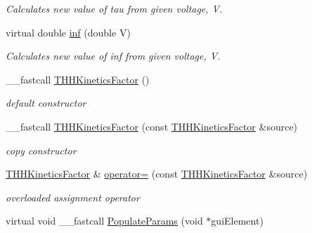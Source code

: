 \begin{DoxyCompactItemize}
\begin{DoxyCompactList}\small\item\em Calculates new value of tau from given voltage, V. \end{DoxyCompactList}\item 
\hypertarget{class_t_h_h_kinetics_factor_a21c8dff53e3fd122ac0a59bcc97e4b61}{virtual double \hyperlink{class_t_h_h_kinetics_factor_a21c8dff53e3fd122ac0a59bcc97e4b61}{inf} (double V)}\label{class_t_h_h_kinetics_factor_a21c8dff53e3fd122ac0a59bcc97e4b61}

\begin{DoxyCompactList}\small\item\em Calculates new value of inf from given voltage, V. \end{DoxyCompactList}\item 
\hypertarget{class_t_h_h_kinetics_factor_a2c636c0456e3999dea4079fbc13fd6e6}{\+\_\+\+\_\+fastcall \hyperlink{class_t_h_h_kinetics_factor_a2c636c0456e3999dea4079fbc13fd6e6}{T\+H\+H\+Kinetics\+Factor} ()}\label{class_t_h_h_kinetics_factor_a2c636c0456e3999dea4079fbc13fd6e6}

\begin{DoxyCompactList}\small\item\em default constructor \end{DoxyCompactList}\item 
\hypertarget{class_t_h_h_kinetics_factor_ae08ba4b5b090e47556c5f7e6a461b96a}{\+\_\+\+\_\+fastcall \hyperlink{class_t_h_h_kinetics_factor_ae08ba4b5b090e47556c5f7e6a461b96a}{T\+H\+H\+Kinetics\+Factor} (const \hyperlink{class_t_h_h_kinetics_factor}{T\+H\+H\+Kinetics\+Factor} \&source)}\label{class_t_h_h_kinetics_factor_ae08ba4b5b090e47556c5f7e6a461b96a}

\begin{DoxyCompactList}\small\item\em copy constructor \end{DoxyCompactList}\item 
\hypertarget{class_t_h_h_kinetics_factor_af303980a4fda7ec3868922163a121f26}{\hyperlink{class_t_h_h_kinetics_factor}{T\+H\+H\+Kinetics\+Factor} \& \hyperlink{class_t_h_h_kinetics_factor_af303980a4fda7ec3868922163a121f26}{operator=} (const \hyperlink{class_t_h_h_kinetics_factor}{T\+H\+H\+Kinetics\+Factor} \&source)}\label{class_t_h_h_kinetics_factor_af303980a4fda7ec3868922163a121f26}

\begin{DoxyCompactList}\small\item\em overloaded assignment operator \end{DoxyCompactList}\item 
\hypertarget{class_t_h_h_kinetics_factor_ac8a055669182b967dfa26446891b951c}{virtual void \+\_\+\+\_\+fastcall \hyperlink{class_t_h_h_kinetics_factor_ac8a055669182b967dfa26446891b951c}{Populate\+Params} (void $\ast$gui\+Element)}\label{class_t_h_h_kinetics_factor_ac8a055669182b967dfa26446891b951c}


\end{DoxyCompactItemize}

